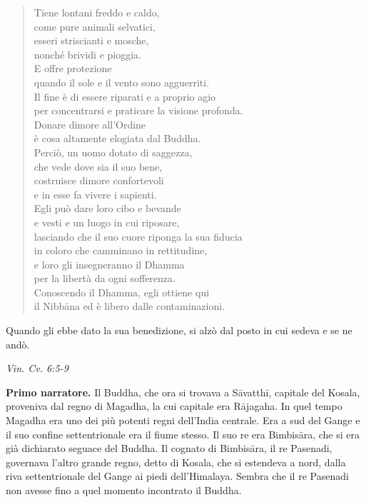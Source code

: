 \begin{quotation}
Tiene lontani freddo e caldo, \\
come pure animali selvatici, \\
esseri striscianti e mosche, \\
nonché brividi e pioggia. \\
E offre protezione \\
quando il sole e il vento sono agguerriti. \\
Il fine è di essere riparati e a proprio agio \\
per concentrarsi e praticare la visione profonda. \\
Donare dimore all’Ordine \\
è cosa altamente elogiata dal Buddha. \\
Perciò, un uomo dotato di saggezza, \\
che vede dove sia il suo bene, \\
costruisce dimore confortevoli \\
e in esse fa vivere i sapienti. \\
Egli può dare loro cibo e bevande \\
e vesti e un luogo in cui riposare, \\
lasciando che il suo cuore riponga la sua fiducia \\
in coloro che camminano in rettitudine, \\
e loro gli insegneranno il Dhamma \\
per la libertà da ogni sofferenza. \\
Conoscendo il Dhamma, egli ottiene qui \\
il Nibbāna ed è libero dalle contaminazioni.
\end{quotation}

Quando gli ebbe dato la sua benedizione, si alzò dal posto in cui sedeva
e se ne andò.


\emph{Vin. Cv. 6:5-9}


\textbf{Primo narratore.} Il Buddha, che ora si trovava a Sāvatthī, capitale del
Kosala, proveniva dal regno di Magadha, la cui capitale era Rājagaha. In
quel tempo Magadha era uno dei più potenti regni dell’India centrale.
Era a sud del Gange e il suo confine settentrionale era il fiume stesso.
Il suo re era Bimbisāra, che si era già dichiarato seguace del Buddha.
Il cognato di Bimbisāra, il re Pasenadi, governava l’altro grande regno,
detto di Kosala, che si estendeva a nord, dalla riva settentrionale del
Gange ai piedi dell’Himalaya. Sembra che il re Pasenadi non avesse fino
a quel momento incontrato il Buddha.



